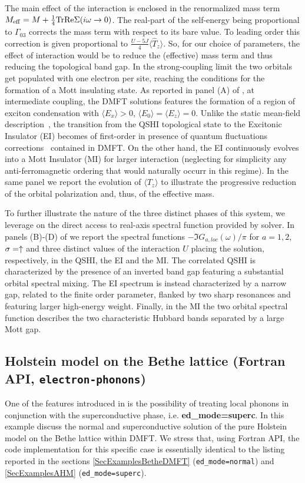\documentclass[edipack2.tex]{subfiles}
\begin{document}
%
The main effect of the interaction is enclosed in the renormalized
mass term $M_\mathrm{eff}=M+\tfrac{1}{4}{\rm Tr}{{\rm Re}\Sigma(i\omega\to0)}$. The
real-part of the self-energy being proportional to $\Gamma_{03}$
corrects the mass term with respect to its bare value. To leading
order this correction is given proportional to $\tfrac{U-5J}{4}\langle
\hat{T}_z\rangle$. So, for our choice of parameters, the effect of
interaction would be to reduce the (effective) mass term and thus
reducing the topological band gap. In the strong-coupling limit the
two orbitals get populated with one electron per site, reaching the
conditions for the formation of a Mott insulating state.
As reported in panel (A) of , at intermediate coupling,
the DMFT solutions features the formation of a
region of exciton condensation with $\langle E_x\rangle>0$, $\langle
E_0\rangle=\langle E_z\rangle=0$. 
Unlike the static mean-field description~\cite{Blason}, the
transition from the QSHI topological state to the Excitonic Insulator 
(EI) becomes of first-order in presence of quantum fluctuations
corrections~\cite{Continentino,Paoletti} contained in DMFT. On the
other hand, the EI continuously evolves into a Mott Insulator (MI)
for larger interaction (neglecting for simplicity any 
anti-ferromagnetic ordering that would naturally occurr in this
regime).
In the same panel we report the evolution of 
$\langle T_z\rangle$ to illustrate the progressive reduction of the
orbital polarization and, thus, of the effective mass. 


To further illustrate the nature of the three distinct phases of this
system, we leverage on the direct access to real-axis spectral
function provided by \NAME solver. In panels (B)-(D) of 
we report the spectral functions $-\Im{G}_{a,loc}(\omega)/\pi$ for
$a=1,2$, $\sigma=\uparrow$ and three distinct values of the interaction
$U$ placing the solution, respectively, in the QSHI, the EI and the MI.
The correlated QSHI is characterized by the presence of an 
inverted band gap featuring a substantial orbital spectral mixing. The
EI spectrum is instead characterized by a narrow gap, related to the
finite order parameter, flanked by two sharp resonances and featuring
larger high-energy weight.
Finally, in the MI the two orbital spectral function describes the two 
characteristic Hubbard bands separated by a large Mott gap.  






\subsection{Holstein model on the Bethe lattice (Fortran API, {\tt electron-phonons})}
One of the features introduced in \NAME is the possibility of treating
local phonons in conjunction with the superconductive phase,
i.e. \textbf{ed\_mode=superc}. 
In this example discuss  the normal and
superconductive solution of the pure Holstein model on the Bethe
lattice within DMFT.
We stress that, using Fortran API, the code
implementation for this specific case is essentially identical to the listing reported in the sections
\ref{SecExamplesBetheDMFT} ({\tt ed\_mode=normal}) and
\ref{SecExamplesAHM} ({\tt ed\_mode=superc}). 
\end{document}
